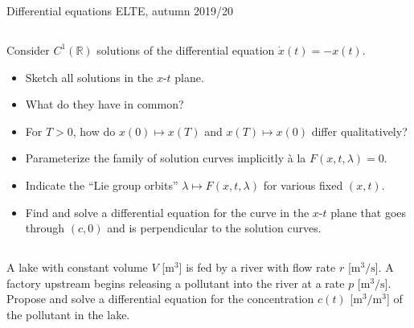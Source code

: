 \documentclass[12pt,a4paper]{article}
\begin{document}
    Differential equations
    \hfill
    ELTE, autumn 2019/20
    
    
    \subsection{}
    
    Consider $C^1(\mathbb{R})$ 
    solutions of the differential equation $\dot{x}(t) = -x(t)$.
    \begin{itemize}
    \item 
        Sketch all solutions in the $x$-$t$ plane.
    \item
        What do they have in common?
    \item
        For $T > 0$,
        how do
        $x(0) \mapsto x(T)$
        and
        $x(T) \mapsto x(0)$
        differ qualitatively?
    \item
        Parameterize the family of solution curves implicitly
        \`a la $F(x, t, \lambda) = 0$.
    \item
        Indicate the ``Lie group orbits'' $\lambda \mapsto F(x, t, \lambda)$ for various fixed $(x, t)$.
    \item
        Find and solve a differential equation
        for the curve in the $x$-$t$ plane
        that goes
        through $(c, 0)$
        and is perpendicular
        to the solution curves.
    \end{itemize}
    
    
    \subsection{}
    
    A lake with constant volume $V$ [$\mathrm{m^3}$]
    is fed by a river with flow rate $r$ [$\mathrm{m^3/s}$].
    A factory upstream begins releasing a pollutant
    into the river at a rate $p$ [$\mathrm{m^3/s}$].
    Propose and solve a differential equation
    for the concentration $c(t)$ [$\mathrm{m^3/m^3}$] of the pollutant in the lake.
    
    
    \subsection{}
    
\end{document}
